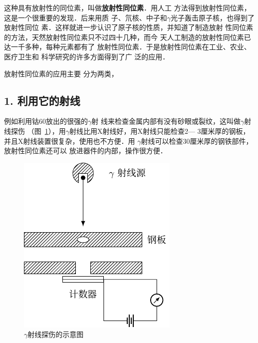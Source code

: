 这种具有放射性的同位素，叫做\textbf{放射性同位素}．用人工
方法得到放射性同位素，这是一个很重要的发现．后来用质
子、氘核、中子和$\gamma$光子轰击原子核，也得到了放射性同位
素．这样就进一步认识了原子核的性质，并知道了制造放射
性同位素的方法，天然放射性同位素只不过四十几种，而今
天人工制造的放射性同位素已
达一千多种，每种元素都有了
放射性同位素．于是放射性同位素在工业、农业、医疗卫生和
科学研究的许多方面得到了广
泛的应用．

放射性同位素的应用主要
分为两类，

\subsection*{1. 利用它的射线}

例如利用钴60放出的很强的$\gamma$射
线来检查金属内部有没有砂眼或裂纹，这叫做$\gamma$射线探伤
（图~\ref{fig_C_9-9}），用$\gamma$射线比用X射线好，用X射线只能检查2—
3厘米厚的钢板，并且X射线装置很复杂，使用也不方便．用
$\gamma$射线可以检查30厘米厚的钢铁部件，放射性同位素还可以
放进器件的内部，操作很方便．
\begin{figure}[htbp]
    \centering
    \includegraphics{fig/C/9-9.pdf}
    \caption{$\gamma$射线探伤的示意图}\label{fig_C_9-9}
\end{figure}

